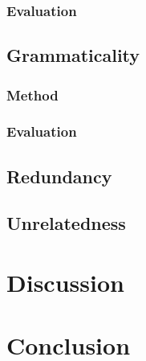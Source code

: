 \documentclass[a4paper,10pt]{scrartcl}
\begin{document}
\subsubsection{Evaluation}

\subsection{Grammaticality}
\subsubsection{Method}
\subsubsection{Evaluation}
\subsection{Redundancy}

\subsection{Unrelatedness} %



\section{Discussion}

\section{Conclusion} %

\newpage


\end{document}
